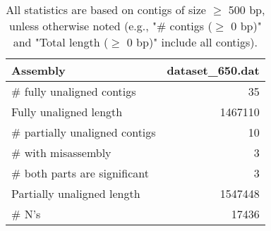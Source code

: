 \documentclass[12pt,a4paper]{article}
\begin{document}
\begin{table}[ht]
\begin{center}
\caption{All statistics are based on contigs of size $\geq$ 500 bp, unless otherwise noted (e.g., "\# contigs ($\geq$ 0 bp)" and "Total length ($\geq$ 0 bp)" include all contigs).}
\begin{tabular}{|l*{1}{|r}|}
\hline
Assembly & dataset\_650.dat \\ \hline
\# fully unaligned contigs & 35 \\ \hline
Fully unaligned length & 1467110 \\ \hline
\# partially unaligned contigs & 10 \\ \hline
\hspace{5mm}\# with misassembly & 3 \\ \hline
\hspace{5mm}\# both parts are significant & 3 \\ \hline
Partially unaligned length & 1547448 \\ \hline
\# N's & 17436 \\ \hline
\end{tabular}
\end{center}
\end{table}
\end{document}
